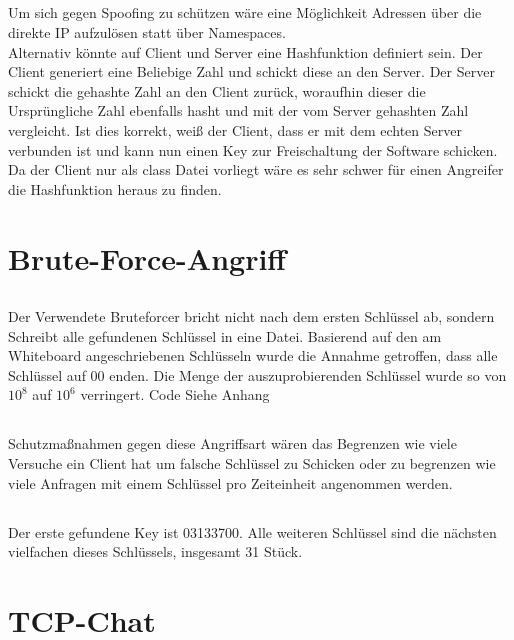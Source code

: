 \documentclass[12pt]{article}
\theoremstyle{plain}
\begin{document}
\subsection{}
Um sich  gegen Spoofing zu schützen wäre eine Möglichkeit Adressen über die direkte IP aufzulösen statt über Namespaces.\\
Alternativ könnte auf Client und Server eine Hashfunktion definiert sein. Der Client generiert eine Beliebige Zahl und schickt diese an den Server. Der Server schickt die gehashte Zahl an den Client zurück, woraufhin dieser die Ursprüngliche Zahl ebenfalls hasht und mit der vom Server gehashten Zahl vergleicht. Ist dies korrekt, weiß der Client, dass er mit dem echten Server verbunden ist und kann nun einen Key zur Freischaltung der Software schicken. Da der Client nur als class Datei vorliegt wäre es sehr schwer für einen Angreifer die Hashfunktion heraus zu finden.
\section{Brute-Force-Angriff}
\subsection{}
Der Verwendete Bruteforcer bricht nicht nach dem ersten Schlüssel ab, sondern Schreibt alle gefundenen Schlüssel in eine Datei. Basierend auf den am Whiteboard angeschriebenen Schlüsseln wurde die Annahme getroffen, dass alle Schlüssel auf 00 enden. Die Menge der auszuprobierenden Schlüssel wurde so von $10^8$ auf $10^6$ verringert. Code Siehe Anhang
\subsection{}
Schutzmaßnahmen gegen diese Angriffsart wären das Begrenzen wie viele Versuche ein Client hat um falsche Schlüssel zu Schicken oder zu begrenzen wie viele Anfragen mit einem Schlüssel pro Zeiteinheit angenommen werden.
\subsection{}
Der erste gefundene Key ist 03133700. Alle weiteren Schlüssel sind die nächsten vielfachen dieses Schlüssels, insgesamt 31 Stück.
\section{TCP-Chat}
\end{document}
